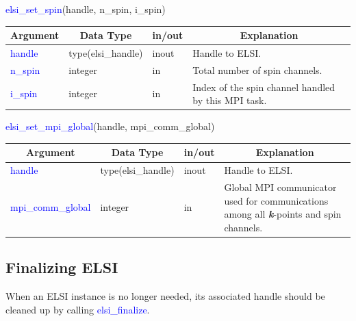 \documentclass{report}
\begin{document}
\bigskip
\begin{labeling}{\hspace{6cm}}
\item [\hspace{0.3cm} \textcolor{blue}{elsi\_set\_spin}(handle, n\_spin, i\_spin)]
\end{labeling}

\begin{tabular}[]{|p{30mm}|p{30mm}|p{15mm}|p{90mm}|}
\hline
\multicolumn{1}{|c|}{\textbf{Argument}} & \multicolumn{1}{c|}{\textbf{Data Type}} & \multicolumn{1}{c|}{\textbf{in/out}} & \multicolumn{1}{c|}{\textbf{Explanation}}\\
\hline
\textcolor{blue}{handle}  & type(elsi\_handle) & inout & Handle to ELSI.\\
\hline
\textcolor{blue}{n\_spin} & integer            & in    & Total number of spin channels.\\
\hline
\textcolor{blue}{i\_spin} & integer            & in    & Index of the spin channel handled by this MPI task.\\
\hline
\end{tabular}

\bigskip
\begin{labeling}{\hspace{6cm}}
\item [\hspace{0.3cm} \textcolor{blue}{elsi\_set\_mpi\_global}(handle, mpi\_comm\_global)]
\end{labeling}

\begin{tabular}[]{|p{30mm}|p{30mm}|p{15mm}|p{90mm}|}
\hline
\multicolumn{1}{|c|}{\textbf{Argument}} & \multicolumn{1}{c|}{\textbf{Data Type}} & \multicolumn{1}{c|}{\textbf{in/out}} & \multicolumn{1}{c|}{\textbf{Explanation}}\\
\hline
\textcolor{blue}{handle}            & type(elsi\_handle) & inout & Handle to ELSI.\\
\hline
\textcolor{blue}{mpi\_comm\_global} & integer            & in    & Global MPI communicator used for communications among all \textbf{\textit{k}}-points and spin channels.\\
\hline
\end{tabular}

\subsection{Finalizing ELSI}
\label{subsec:setup_final}
When an ELSI instance is no longer needed, its associated handle should be cleaned up by calling \textcolor{blue}{elsi\_finalize}.\\
\end{document}

